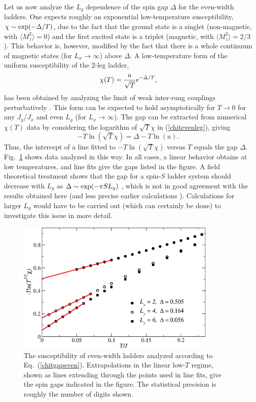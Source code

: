 \documentclass[draft,numberedheadings]{aipproc}
\begin{document}
Let us now analyze the $L_y$ dependence of the spin gap $\Delta$ for the even-width ladders. One expects roughly an exponential low-temperature
susceptibility, $\chi \sim {\rm exp}(-\Delta/T)$, due to the fact that the ground state is a singlet (non-magnetic, with $\langle M^2_z\rangle =0$) and the 
first excited state is a triplet (magnetic, with $\langle M^2_z\rangle =2/3$). This behavior is, however, modified by the fact that there is a whole continuum 
of magnetic states (for $L_x \to \infty$) above $\Delta$. A low-temperature form of the uniform susceptibility of the 2-leg ladder,
\begin{equation}
\chi(T) = \frac{a}{\sqrt{T}} {\rm e}^{-\Delta/T},
\label{chitevenleg}
\end{equation}
has been obtained by analyzing the limit of weak inter-rung couplings perturbatively \cite{troyer94}. This form can be expected to hold asymptotically
for $T\to 0$ for any $J_y/J_x$ and even $L_y$ (for $L_x \to \infty$). The gap can be extracted from numerical $\chi(T)$ data by considering the 
logarithm of $\sqrt{T}\chi$ in (\ref{chitevenleg}), giving
\begin{equation}
-T\ln(\sqrt{T}\chi) = \Delta - T\ln(a).
\label{chitgapeven}
\end{equation}
Thus, the intercept of a line fitted to $-T\ln(\sqrt{T}\chi)$ versus $T$ equals the gap $\Delta$. Fig.~\ref{laddgap} shows data analyzed in this way. In all cases, 
a linear behavior obtains at low temperatures, and line fits give the gaps listed in the figure. A field theoretical treatment shows that the gap for a spin-$S$ 
ladder system should decrease with $L_y$ as $\Delta \sim {\rm exp}(-\pi S L_y)$ \cite{dellaringa97}, which is not in good agreement with the results obtained here 
(and less precise earlier calculations \cite{frischmuth96}). Calculations for larger $L_y$ would have to be carried out (which can certainly be done) to investigate 
this issue in more detail.

\begin{figure}
\includegraphics[width=9.75cm, clip]{laddgap.eps}
\caption{The susceptibility of even-width ladders analyzed according to Eq.~(\ref{chitgapeven}). Extrapolations in the linear low-$T$ regime, shown as 
lines extending through the points used in line fits, give the spin gaps indicated in the figure. The statistical precision is roughly the number of
digits shown.}
\label{laddgap}
\end{figure}
\end{document}
